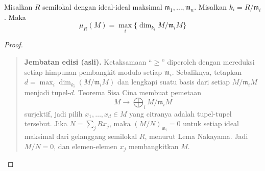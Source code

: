  \begin{theorem}
Misalkan $R$ semilokal dengan ideal-ideal maksimal $\mathfrak{m}_1,\dots,
\mathfrak{m}_n$. Misalkan $k_i = R/\mathfrak{m}_i$. Maka
   \[
     \mu_R(M) = \max_i \{\dim_{k_i} M/\mathfrak{m}_i M\}
   \]
 \end{theorem}
\begin{proof} 
\begin{quote}\small\textbf{Jembatan edisi (asli).}
Ketaksamaan ``$\geq$'' diperoleh dengan mereduksi setiap himpunan pembangkit modulo setiap
$\mathfrak m_i$. Sebaliknya, tetapkan $d=\max_i\dim_{k_i}(M/\mathfrak m_iM)$
dan lengkapi suatu basis dari setiap $M/\mathfrak m_iM$ menjadi tupel-$d$. Teorema
Sisa Cina membuat pemetaan
\[
  M\longrightarrow\bigoplus_i M/\mathfrak m_iM
\]
surjektif, jadi pilih $x_1,\ldots,x_d\in M$ yang citranya adalah tupel-tupel tersebut.
Jika $N=\sum_jRx_j$, maka $(M/N)_{\mathfrak m_i}=0$ untuk setiap ideal maksimal dari
gelanggang semilokal $R$, menurut Lema Nakayama. Jadi $M/N=0$, dan elemen-elemen $x_j$
membangkitkan $M$.\end{quote}
\end{proof} 
 
